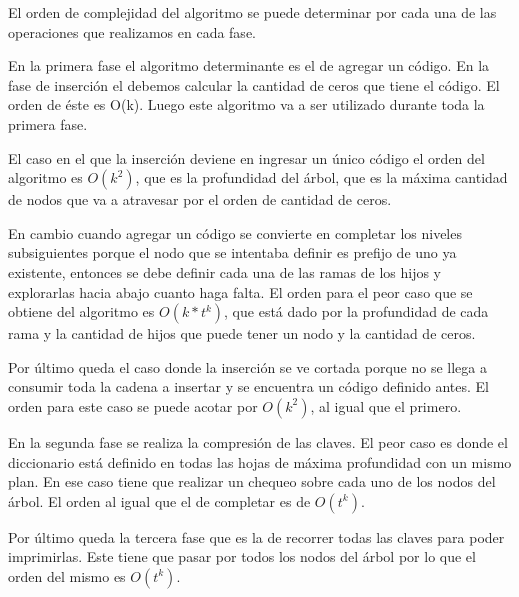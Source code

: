 El orden de complejidad del algoritmo se puede determinar por cada una de las operaciones que realizamos
en cada fase. 

En la primera fase el algoritmo determinante es el de agregar un código. 
En la fase de inserción el debemos calcular la cantidad de ceros que tiene el código. 
El orden de éste es O(k). Luego este algoritmo va a ser utilizado durante toda la primera fase.

El caso en el que la inserción deviene en ingresar un único código el
orden del algoritmo es $O(k^2)$, que es la profundidad del árbol, que es la
máxima cantidad de nodos que va a atravesar por el orden de cantidad de ceros.

En cambio cuando agregar un código se convierte en completar los niveles
subsiguientes porque el nodo que se intentaba definir es prefijo de uno ya
existente, entonces se debe definir cada una de las ramas de los hijos y
explorarlas hacia abajo cuanto haga falta. El orden para el peor caso que se
obtiene del algoritmo es $O(k*t^k)$, que está dado por la profundidad de cada
rama y la cantidad de hijos que puede tener un nodo y la cantidad de ceros.

Por último queda el caso donde la inserción se ve cortada porque no
se llega a consumir toda la cadena a insertar y se encuentra un código
definido antes. El orden para este caso se puede acotar por $O(k^2)$, al igual
que el primero.

En la segunda fase se realiza la compresión de las claves. El peor caso es
donde el diccionario está definido en todas las hojas de máxima profundidad
con un mismo plan. En ese caso tiene que realizar un chequeo sobre cada uno
de los nodos del árbol. El orden al igual que el de completar es de $O(t^k)$.

Por último queda la tercera fase que es la de recorrer todas las claves para
poder imprimirlas. Este tiene que pasar por todos los nodos del árbol por lo que
el orden del mismo es $O(t^k)$.
